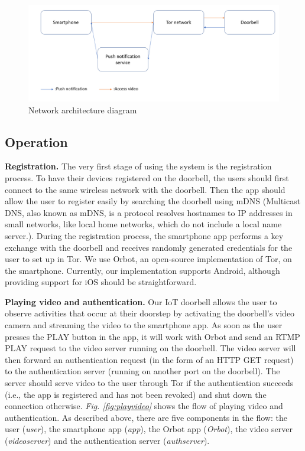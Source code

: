 \begin{figure}
	\includegraphics[width=\linewidth]{architecture.png}
	\caption{Network architecture diagram}
	\label{fig:architecture}
\end{figure}

\subsection{Operation}

\textbf{Registration.} The very first stage of using the system is the registration process. To have their devices registered on the doorbell, the users should first connect to the same wireless network with the doorbell. Then the app should allow the user to register easily by searching the doorbell using mDNS (Multicast DNS, also known as mDNS, is a protocol resolves hostnames to IP addresses in small networks, like local home networks, which do not include a local name server.). During the registration process, the smartphone app performs a key exchange with the doorbell and receives randomly generated credentials for the user to set up in Tor. We use Orbot, an open-source implementation of Tor, on the smartphone. Currently, our implementation supports Android, although providing support for iOS should be straightforward.

\textbf{Playing video and authentication.} Our IoT doorbell allows the user to observe activities that occur at their doorstep by activating the doorbell's video camera and streaming the video to the smartphone app. As soon as the user presses the PLAY button in the app, it will work with Orbot and send an RTMP PLAY request to the video server running on the doorbell. The video server will then forward an authentication request (in the form of an HTTP GET request) to the authentication server (running on another port on the doorbell). The server should serve video to the user through Tor if the authentication succeeds (i.e., the app is registered and has not been revoked) and shut down the connection otherwise.
\textit{Fig. \ref{fig:playvideo}} shows the flow of playing video and authentication. As described above, there are five components in the flow: the user (\textit{user}), the smartphone app (\textit{app}), the Orbot app (\textit{Orbot}), the video server (\textit{videoserver}) and the authentication server (\textit{authserver}).

